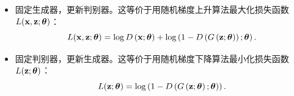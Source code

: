 \begin{itemize}
	\item 固定生成器，更新判别器。这等价于用随机梯度上升算法最大化损失函数$L(\mathbf{x},\mathbf{z};\mbox{\boldmath $\theta$})$：
	\begin{equation*}
	L(\mathbf{x},\mathbf{z};\mbox{\boldmath $\theta$})=\log D\left(\mathbf{x};\mbox{\boldmath $\theta$}\right)+\log \left(1-D\left(G\left(\mathbf{z};\mbox{\boldmath $\theta$}\right)\right);\mbox{\boldmath $\theta$}\right).
	\end{equation*}
	\item 固定判别器，更新生成器。这等价于用随机梯度下降算法最小化损失函数$L(\mathbf{z};\mbox{\boldmath $\theta$})$：
	\begin{equation*}
	L(\mathbf{z};\mbox{\boldmath $\theta$})=\log \left(1-D\left(G\left(\mathbf{z};\mbox{\boldmath $\theta$}\right);\mbox{\boldmath $\theta$}\right)\right).
	\end{equation*}
\end{itemize}


